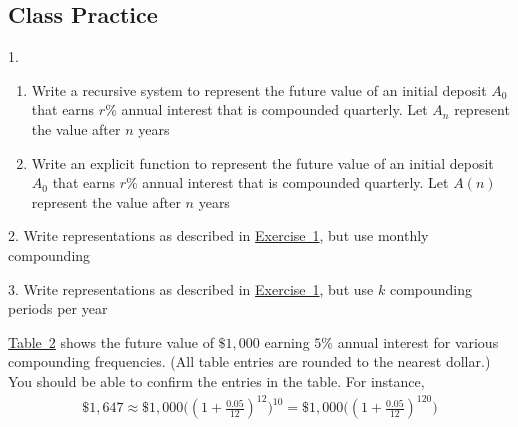 \documentclass[10pt,]{book}
\theoremstyle{plain}
\theoremstyle{definition}
\theoremstyle{definition}
\theoremstyle{definition}
\numberwithin{equation}{section}
\begin{document}
\subsection[{Class Practice}]{Class Practice}\label{exercises-7}
\begin{exerciselist}
\item[1.]\hypertarget{chapter04-section05-classpractice-recursive-vs-explicit}{}\leavevmode%
\begin{enumerate}[label=(\alph*)]
\item\hypertarget{li-104}{}Write a recursive system to represent the future value of an initial deposit \(A_0\) that earns \(r\%\) annual interest that is compounded quarterly. Let \(A_n\) represent the value after \(n\) years%
\item\hypertarget{li-105}{}Write an explicit function to represent the future value of an initial deposit \(A_0\) that earns \(r\%\) annual interest that is compounded quarterly. Let \(A(n)\) represent the value after \(n\) years%
\end{enumerate}
\par\smallskip
\item[2.]\hypertarget{exercise-48}{}\hypertarget{p-206}{}%
Write representations as described in \hyperlink{chapter04-section05-classpractice-recursive-vs-explicit}{Exercise~1}, but use monthly compounding%
\par\smallskip
\item[3.]\hypertarget{exercise-49}{}\hypertarget{p-207}{}%
Write representations as described in \hyperlink{chapter04-section05-classpractice-recursive-vs-explicit}{Exercise~1}, but use \(k\) compounding periods per year%
\par\smallskip
\end{exerciselist}
\hypertarget{p-208}{}%
\hyperref[impact-of-compounding-table]{Table~2} shows the future value of \(\$1,000\) earning \(5\%\) annual interest for various compounding frequencies. (All table entries are rounded to the nearest dollar.) You should be able to confirm the entries in the table.  For instance,%
%
\begin{gather*}
\$1,647 \approx \$1,000 \bigg( ( 1 + \frac{0.05}{12}) ^{12} \bigg)^{10} = \$1,000 \bigg( ( 1 + \frac{0.05}{12})^{120}\bigg)
\end{gather*}
\end{document}
